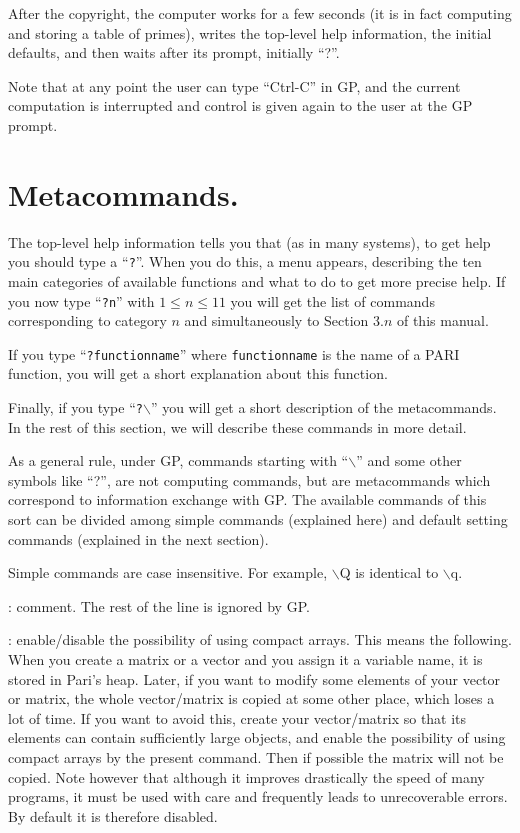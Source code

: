 After the copyright, the computer works for a few seconds (it is in fact
computing and storing a table of primes), writes the top-level
help information, the initial defaults, and then waits after its
prompt, initially ``?''.

Note that at any point the user can type ``Ctrl-C'' in GP, and the
current computation is interrupted and control is given again to the user
at the GP prompt.

\section{Metacommands.}

The top-level help information tells you that (as in many systems), to
get help you should type a ``{\tt ?}''. When you do this, a menu appears,
describing the ten main categories of available functions and what to do
to get more precise help. If you now type ``{\tt ?n}'' with $1\le n\le11$
you will get the list of commands corresponding to category $n$ and
simultaneously to Section $3.n$ of this manual. 

If you type ``{\tt ?functionname}'' where {\tt functionname} is the
name of a PARI function, you will get a short explanation about this
function.

Finally, if you type ``{\tt ?$\backslash$}'' you will get a short
description of the metacommands. In the rest of this section, we will
describe these commands in more detail.

As a general rule, under GP, commands starting with ``$\backslash$'' and some
other symbols like ``?'', are not computing commands, but are metacommands
which correspond to information exchange with GP. The available commands of 
this sort can be divided among simple commands (explained here) and default
setting commands (explained in the next section).

Simple commands are case insensitive. For example, $\backslash$Q is identical 
to $\backslash$q.

\subsec{$\backslash\backslash$}: comment. The rest of the line
is ignored by GP.

\subsec{$\backslash[$}: enable/disable the possibility of using compact arrays.
This means the following. When you create a matrix or a vector and you
assign it a variable name, it is stored in Pari's heap. Later, if you want
to modify some elements of your vector or matrix, the whole vector/matrix
is copied at some other place, which loses a lot of time. If you want to
avoid this, create your vector/matrix so that its elements can contain
sufficiently large objects, and enable the possibility of using compact arrays
by the present command. Then if possible the matrix will not be copied.
Note however that although it improves drastically the speed of many programs,
it must be used with care and frequently leads to unrecoverable errors.
By default it is therefore disabled.

